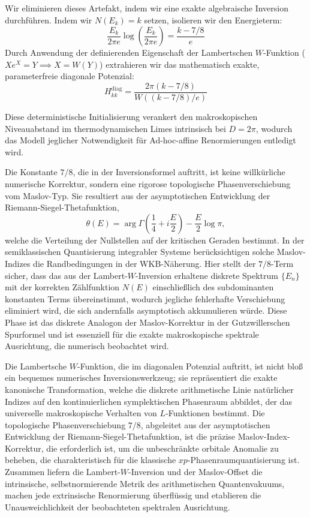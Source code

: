 \documentclass[aps,prl,preprint,superscriptaddress,floatfix]{revtex4-2}
\begin{document}
Wir eliminieren dieses Artefakt, indem wir eine exakte algebraische Inversion durchführen. Indem wir $N(E_k) = k$ setzen, isolieren wir den Energieterm:
\begin{equation}
\frac{E_k}{2\pi e} \log\left(\frac{E_k}{2\pi e}\right) = \frac{k - 7/8}{e}
\end{equation}
Durch Anwendung der definierenden Eigenschaft der Lambertschen $W$-Funktion ($X e^X = Y \implies X = W(Y)$) extrahieren wir das mathematisch exakte, parameterfreie diagonale Potenzial:
\begin{equation}
\boxed{ H_{kk}^{\text{diag}} = \frac{2\pi (k - 7/8)}{W((k - 7/8)/e)} }
\end{equation}

Diese deterministische Initialisierung verankert den makroskopischen Niveauabstand im thermodynamischen Limes intrinsisch bei $D = 2\pi$, wodurch das Modell jeglicher Notwendigkeit für Ad-hoc-affine Renormierungen entledigt wird.

Die Konstante $7/8$, die in der Inversionsformel auftritt, ist keine willkürliche numerische Korrektur, sondern eine rigorose topologische Phasenverschiebung vom Maslov-Typ. Sie resultiert aus der asymptotischen Entwicklung der Riemann-Siegel-Thetafunktion,
\begin{equation}
\theta(E) = \arg\Gamma\left(\frac14 + i\frac{E}{2}\right) - \frac{E}{2}\log\pi,
\end{equation}
welche die Verteilung der Nullstellen auf der kritischen Geraden bestimmt. In der semiklassischen Quantisierung integrabler Systeme berücksichtigen solche Maslov-Indizes die Randbedingungen in der WKB-Näherung. Hier stellt der $7/8$-Term sicher, dass das aus der Lambert-$W$-Inversion erhaltene diskrete Spektrum $\{E_n\}$ mit der korrekten Zählfunktion $N(E)$ einschließlich des subdominanten konstanten Terms übereinstimmt, wodurch jegliche fehlerhafte Verschiebung eliminiert wird, die sich andernfalls asymptotisch akkumulieren würde. Diese Phase ist das diskrete Analogon der Maslov-Korrektur in der Gutzwillerschen Spurformel und ist essenziell für die exakte makroskopische spektrale Ausrichtung, die numerisch beobachtet wird.

Die Lambertsche $W$-Funktion, die im diagonalen Potenzial auftritt, ist nicht bloß ein bequemes numerisches Inversionswerkzeug; sie repräsentiert die exakte kanonische Transformation, welche die diskrete arithmetische Linie natürlicher Indizes auf den kontinuierlichen symplektischen Phasenraum abbildet, der das universelle makroskopische Verhalten von $L$-Funktionen bestimmt. Die topologische Phasenverschiebung $7/8$, abgeleitet aus der asymptotischen Entwicklung der Riemann-Siegel-Thetafunktion, ist die präzise Maslov-Index-Korrektur, die erforderlich ist, um die unbeschränkte orbitale Anomalie zu beheben, die charakteristisch für die klassische $xp$-Phasenraumquantisierung ist. Zusammen liefern die Lambert-$W$-Inversion und der Maslov-Offset die intrinsische, selbstnormierende Metrik des arithmetischen Quantenvakuums, machen jede extrinsische Renormierung überflüssig und etablieren die Unausweichlichkeit der beobachteten spektralen Ausrichtung.
\end{document}
